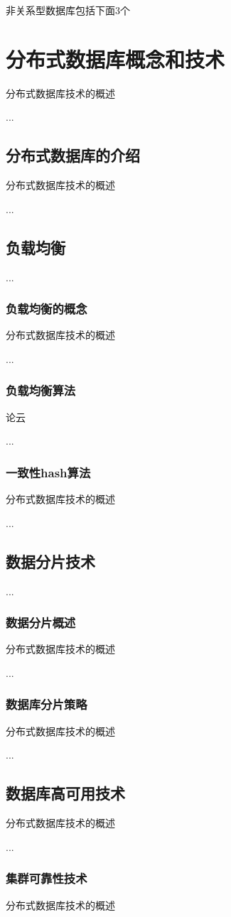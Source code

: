 非关系型数据库包括下面3个
\section{分布式数据库概念和技术}
分布式数据库技术的概述

...
\subsection{分布式数据库的介绍}
分布式数据库技术的概述

...
\subsection{负载均衡}
...
\subsubsection*{负载均衡的概念}
分布式数据库技术的概述

...
\subsubsection*{负载均衡算法}
论云

...
\subsubsection*{一致性hash算法}
分布式数据库技术的概述

...
\subsection{数据分片技术}
...
\subsubsection*{数据分片概述}
分布式数据库技术的概述

...
\subsubsection*{数据库分片策略}
分布式数据库技术的概述

...
\subsection{数据库高可用技术}
分布式数据库技术的概述

...
\subsubsection*{集群可靠性技术}
分布式数据库技术的概述

